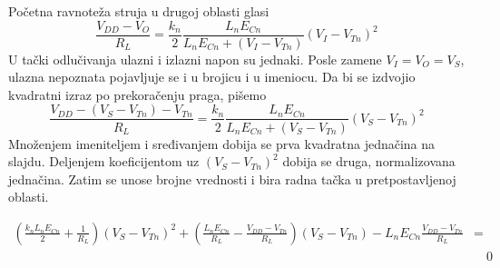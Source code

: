Početna ravnoteža struja u drugoj oblasti glasi
\[\frac{V_{DD}-V_O}{R_L}=\frac{k_n}{2}\frac{L_nE_{Cn}}{L_nE_{Cn}+(V_I-V_{Tn})}(V_I-V_{Tn})^2\]
U tački odlučivanja ulazni i izlazni napon su jednaki. Posle zamene $V_I=V_O=V_S$, ulazna nepoznata pojavljuje se i u brojicu i u imeniocu. Da bi se izdvojio kvadratni izraz po prekoračenju praga, pišemo
\[\frac{V_{DD}-(V_S-V_{Tn})-V_{Tn}}{R_L}=\frac{k_n}{2}\frac{L_nE_{Cn}}{L_nE_{Cn}+(V_S-V_{Tn})}(V_S-V_{Tn})^2\]
Množenjem imeniteljem i sređivanjem dobija se prva kvadratna jednačina na slajdu. Deljenjem koeficijentom uz $(V_S-V_{Tn})^2$ dobija se druga, normalizovana jednačina. Zatim se unose brojne vrednosti i bira radna tačka u pretpostavljenoj oblasti.

\[\begin{aligned}\left(\frac{k_nL_nE_{Cn}}2+\frac1{R_L}\right)(V_S-V_{Tn})^2+\left(\frac{L_nE_{Cn}}{R_L}-\frac{V_{DD}-V_{Tn}}{R_L}\right)(V_S-V_{Tn})-L_nE_{Cn}\frac{V_{DD}-V_{Tn}}{R_L}&=\\&\quad 0\end{aligned}\]

